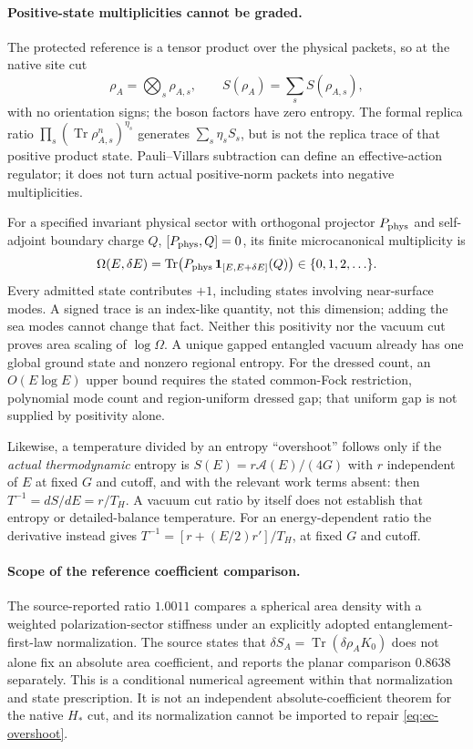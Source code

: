 \documentclass[10pt]{article}
\newcommand{\Tr}{\operatorname{Tr}}
\begin{document}
\paragraph{Positive-state multiplicities cannot be graded.}
The protected reference is a tensor product over the physical
packets, so at the native site cut
\[
 \rho_A=\bigotimes_s\rho_{A,s},\qquad
 S(\rho_A)=\sum_sS(\rho_{A,s}),
\]
with no orientation signs; the boson factors have zero entropy.
The formal replica ratio $\prod_s(\Tr\rho_{A,s}^n)^{\eta_s}$
generates $\sum_s\eta_sS_s$, but is not the replica trace of that
positive product state. Pauli--Villars subtraction can define an
effective-action regulator; it does not turn actual positive-norm
packets into negative multiplicities.

For a specified invariant physical sector with orthogonal projector
$P_{\rm phys}$ and self-adjoint boundary charge $Q$,
$[P_{\rm phys},Q]=0$, its finite microcanonical multiplicity is
\[
 \Omega(E,\delta E)=
 \Tr\bigl(P_{\rm phys}\,\mathbf1_{[E,E+\delta E]}(Q)\bigr)
       \in\{0,1,2,\ldots\}.
\]
Every admitted state contributes $+1$, including states involving
near-surface modes. A signed trace is an index-like quantity, not
this dimension; adding the sea modes cannot change that fact.
Neither this positivity nor the vacuum cut proves area scaling of
$\log\Omega$. A unique gapped entangled vacuum already has one
global ground state and nonzero regional entropy. For the dressed
count, an $O(E\log E)$ upper bound requires the stated common-Fock
restriction, polynomial mode count and region-uniform dressed gap;
that uniform gap is not supplied by positivity alone.

Likewise, a temperature divided by an entropy ``overshoot'' follows
only if the \emph{actual thermodynamic} entropy is
$S(E)=r\mathcal A(E)/(4G)$ with $r$ independent of $E$ at fixed
$G$ and cutoff, and with the relevant work terms absent:
then $T^{-1}=dS/dE=r/T_H$. A vacuum cut ratio by itself does not
establish that entropy or detailed-balance temperature.
For an energy-dependent ratio the derivative instead gives
$T^{-1}=[r+(E/2)r']/T_H$, at fixed $G$ and cutoff.

\paragraph{Scope of the reference coefficient comparison.}
The source-reported ratio $1.0011$ compares a spherical area density
with a weighted polarization-sector stiffness under an explicitly
adopted entanglement-first-law normalization. The source states that
$\delta S_A=\Tr(\delta\rho_A K_0)$ does not alone fix an absolute
area coefficient, and reports the planar comparison $0.8638$
separately. This is a conditional numerical agreement within that
normalization and state prescription. It is not an independent
absolute-coefficient theorem for the native $H_*$ cut, and its
normalization cannot be imported to repair
\eqref{eq:ec-overshoot}.
\end{document}
